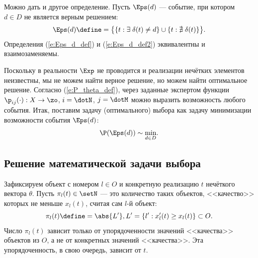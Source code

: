 Можно дать и другое определение. Пусть $\Eps(d)$ --- событие, при котором $d \in D$ не является верным решением:
\begin{equation}
  \label{e:Eps_d_def2}
  \Eps(d) \define= \big\{\{t: \exists\; \delta(t) \neq d\} \cup \{t: \nexists\; \delta(t)\}\big\}. 
\end{equation}
Определения (\ref{e:Eps_d_def}) и (\ref{e:Eps_d_def2}) эквивалентны и взаимозаменяемы.


Поскольку в реальности $\Exp$ не проводится и реализации нечётких элементов неизвестны, мы не можем найти верное решение, но можем найти оптимальное решение. Согласно (\ref{e:P_theta_def}), через заданные экспертом функции $\p_{ij}(\cdot): X \rightarrow \zo$, $i = \dotN$, $j = \dotM$ можно выразить возможность любого события.  Итак, поставим задачу (оптимального) выбора {} как задачу минимизации возможности события $\Eps(d)$:
\begin{equation}
  \label{e:zadacha}
  \P(\Eps(d)) \sim \underset{d \in D} \min.
\end{equation}

\subsection{Решение математической задачи выбора}

Зафиксируем объект с номером $l \in O$ и конкретную реализацию  $t$ нечёткого вектора $\theta$. Пусть $\pi_l(t) \in \setN$ --- это количество таких объектов, <<качество>> которых не меньше $x_l(t)$, считая сам $l$-й объект:
\begin{equation*}
  \pi_l(t) \define=  \abs{L'}, L' = \{l': x_l'(t) \geq x_{l}(t)\}  \subset O.
\end{equation*}
 Число $\pi_l(t)$ зависит только от упорядоченности значений <<качества>> объектов из $O$, а не от конкретных значений <<качества>>. Эта упорядоченность, в свою очередь, зависит от $t$. 

